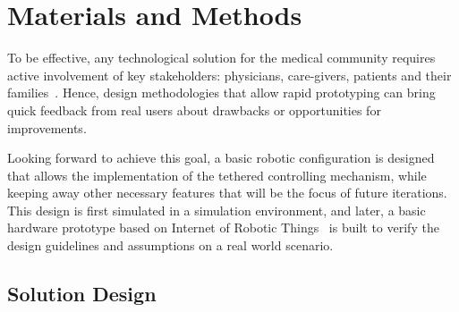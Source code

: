 \documentclass[journal]{IEEEtran}
\begin{document}
\section{Materials and Methods}
\label{materials}


To be effective, any technological solution for the medical community requires active involvement of key stakeholders: physicians, care-givers, patients and their families~\cite{Gaggioli2006,Fasola2012,Cherubini2008,Wolpaw2012BraincomputerIP,Salvini2015}.  Hence, design methodologies that allow rapid prototyping can bring quick feedback from real users about drawbacks or opportunities for improvements. 

Looking forward to achieve this goal, a basic robotic configuration is designed that allows the implementation of the  tethered controlling mechanism, while keeping away other necessary features that will be the focus of future iterations.  This design is first simulated in a simulation environment, and later, a basic hardware prototype based on Internet of Robotic Things~\cite{Simoens2018}  is built to verify the design guidelines and assumptions on a real world scenario.


\subsection{Solution Design}
\end{document}
